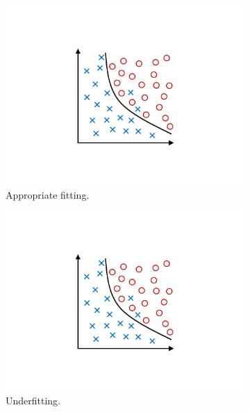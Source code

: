 \documentclass{l4proj}
\begin{document}
\begin{figure}[ht]
  \centering
  \begin{subfigure}[h!]{0.3\textwidth}
    \includegraphics[width=\textwidth, page={1}, trim={6.5cm 4cm 6.5cm 4cm}, clip]{images/Overfitting}
    \caption{Appropriate fitting.}
  \end{subfigure}
  \begin{subfigure}[h!]{0.3\textwidth}
    \includegraphics[width=\textwidth, page={2}, trim={6.5cm 4cm 6.5cm 4cm}, clip]{images/Overfitting}
    \caption{Underfitting.}
  \end{subfigure}
  \begin{subfigure}[h!]{0.3\textwidth}

\end{subfigure}
\end{figure}
\end{document}
